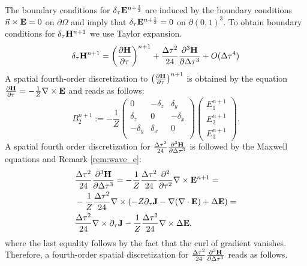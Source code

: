 \documentclass[12pt,reqno]{amsart}
\newcommand{\e}{{\bf E}}
\newcommand{\h}{{\bf H}}
\newcommand{\J}{{\bf J}}
\theoremstyle{definition}
\numberwithin{equation}{section}
\def\Gw{\Omega}     \def\Gx{\Xi}         \def\Gy{\Psi}
\begin{document}
	The boundary conditions for $\delta_{\tau}\e^{n+\frac{1}{2}}$ are induced by the boundary conditions $\vec{n}\times \e=0$ on $\partial \Gw$ and 
	 imply that 
	$\delta_{\tau}\e^{n+\frac{1}{2}}=0$ on $\partial (0,1)^3$.
	To obtain boundary conditions for 
	 $\delta_\tau \h^{n+1}$ we use Taylor expansion.
		\begin{equation}\label{eq:next_term}
		\delta_\tau \h^{n+1}=
		\left (\frac{\partial \h}{\partial \tau}\right)^{n+1}+
		\frac{\Delta \tau^2}{24}\frac{\partial^3\h}{\partial \Delta \tau^3}+
		O(\Delta \tau ^4)
	\end{equation}
	A spatial fourth-order discretization to $  \left (\frac{\partial \h}{\partial \tau}\right)^{n+1}$
	is obtained by the equation $\frac{\partial \h}{\partial \tau}=-\frac{1}{Z}\nabla \times \e$ and reads as follows:
	\begin{equation}
		B_2^{n+1}:=
		-\frac{1}{Z}	\begin{pmatrix}
			0& -\delta_z & \delta _y\\
			\delta_z&0&-\delta_x\\
			-\delta_y&\delta_x&0\\
		\end{pmatrix}
		\begin{pmatrix}
			E_1^{n+1}\\
			E_2^{n+1}\\
			E_3^{n+1}
		\end{pmatrix}.
	\end{equation}
	A spatial fourth order discretization for $\frac{\Delta \tau^2}{24}\frac{\partial^3\h}{\partial \Delta \tau^3}$ is followed by the Maxwell equations and Remark \ref{rem:wave_e}:
	\begin{align*}
		&
		\frac{\Delta \tau^2}{24}\frac{\partial^3\h}{\partial \Delta \tau^3}=
		-\frac{1}{Z}\frac{\Delta \tau^2}{24}\frac{\partial^2}{\partial  \tau^2}\nabla \times \e^{n+1}=\\&
		-\frac{1}{Z}\frac{\Delta \tau^2}{24}\nabla \times (-Z\partial_{\tau}\J-\nabla(\nabla \cdot \e)+\Delta \e)=\\&
		\frac{\Delta \tau^2}{24}\nabla\times \partial_{\tau}\J
		-\frac{1}{Z}\frac{\Delta \tau^2}{24}\nabla\times \Delta \e,
	\end{align*}
	where the last equality follows by the fact that the curl of gradient vanishes.
	Therefore, a fourth-order spatial discretization for $\frac{\Delta \tau^2}{24}\frac{\partial^3\h}{\partial \Delta \tau^3}$ reads as follows.
\end{document}
